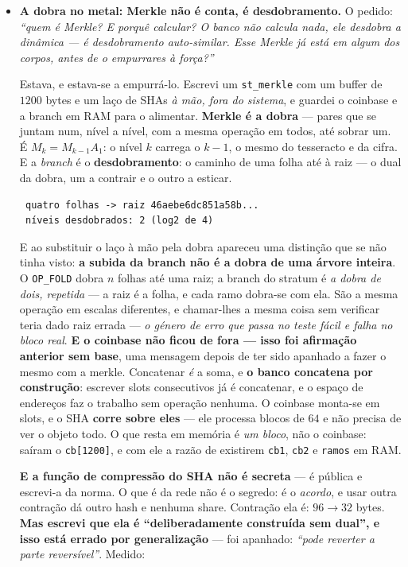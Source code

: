 \documentclass[11pt]{article}
\newcommand{\code}[1]{\texttt{\small #1}}
\theoremstyle{plain}
\theoremstyle{remark}
\begin{document}
\begin{itemize}
\textbf{Uma porta só}, e o catálogo sobreviveu à reordenação: 42 corpos, 18 lugares, matriz
métrica. Texto, racional, corpo, formato e linguagem entram todos pelo mesmo operador.

\item \textbf{A dobra no metal: Merkle não é conta, é desdobramento.} O pedido: \emph{``quem é
Merkle? E porquê calcular? O banco não calcula nada, ele desdobra a dinâmica --- é desdobramento
auto-similar. Esse Merkle já está em algum dos corpos, antes de o empurrares à força?''}

Estava, e estava-se a empurrá-lo. Escrevi um \code{st\_merkle} com um buffer de $1200$ bytes e um
laço de SHAs \emph{à mão, fora do sistema}, e guardei o coinbase e a branch em RAM para o
alimentar. \textbf{Merkle é a dobra} --- pares que se juntam num, nível a nível, com a mesma
operação em todos, até sobrar um. É $M_k = M_{k-1}A_1$: o nível $k$ carrega o $k-1$, o mesmo do
tesseracto e da cifra. E a \emph{branch} é o \textbf{desdobramento}: o caminho de uma folha até à
raiz --- o dual da dobra, um a contrair e o outro a esticar.

\begin{verbatim}
 quatro folhas -> raiz 46aebe6dc851a58b...
 níveis desdobrados: 2 (log2 de 4)
\end{verbatim}

E ao substituir o laço à mão pela dobra apareceu uma distinção que se não tinha visto: \textbf{a
subida da branch não é a dobra de uma árvore inteira}. O \code{OP\_FOLD} dobra $n$ folhas até uma
raiz; a branch do stratum é \emph{a dobra de dois, repetida} --- a raiz é a folha, e cada ramo
dobra-se com ela. São a mesma operação em escalas diferentes, e chamar-lhes a mesma coisa sem
verificar teria dado raiz errada --- \emph{o género de erro que passa no teste fácil e falha no
bloco real}. \textbf{E o coinbase não ficou de fora --- isso foi afirmação anterior sem base}, uma mensagem depois
de ter sido apanhado a fazer o mesmo com a merkle. Concatenar \emph{é} a soma, e \textbf{o banco
concatena por construção}: escrever slots consecutivos já é concatenar, e o espaço de endereços faz
o trabalho sem operação nenhuma. O coinbase monta-se em slots, e o SHA \textbf{corre sobre eles}
--- ele processa blocos de $64$ e não precisa de ver o objeto todo. O que resta em memória é
\emph{um bloco}, não o coinbase: saíram o \code{cb[1200]}, e com ele a razão de existirem
\code{cb1}, \code{cb2} e \code{ramos} em RAM.

\textbf{E a função de compressão do SHA não é secreta} --- é pública e escrevi-a da norma. O que
é da rede não é o segredo: é o \emph{acordo}, e usar outra contração dá outro hash e nenhuma share.
Contração ela é: $96 \to 32$ bytes. \textbf{Mas escrevi que ela é ``deliberadamente construída
sem dual'', e isso está errado por generalização} --- foi apanhado: \emph{``pode reverter a
parte reversível''}. Medido:


\end{itemize}
\end{document}
